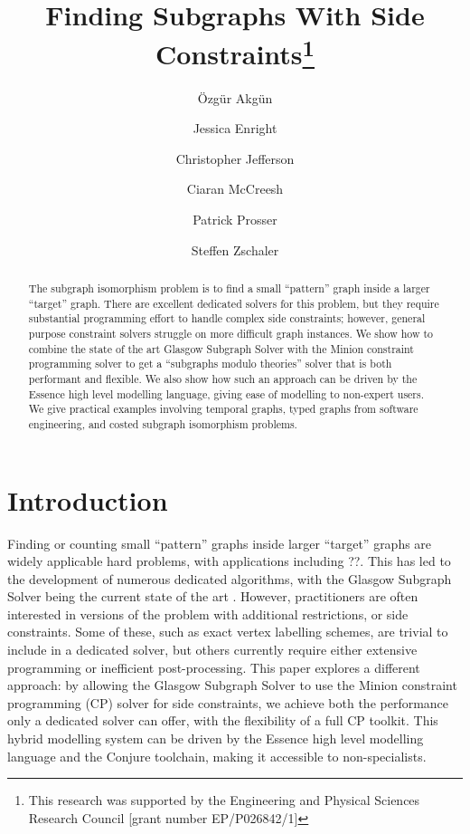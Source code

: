\documentclass[runningheads]{llncs}
\title{Finding Subgraphs With Side Constraints\thanks{This research was supported by the
Engineering and Physical Sciences Research Council [grant number EP/P026842/1]}}
\author{
    \"Ozg\"ur Akg\"un\inst{1} \and Jessica Enright\inst{2} \and Christopher
    Jefferson\inst{1} \and Ciaran McCreesh\inst{2} \and Patrick
    Prosser\inst{3} \and Steffen Zschaler\inst{4} \\
}
\institute{
    University of St Andrews, Scotland \and
    University of Glasgow, Scotland \\ \email{ciaran.mccreesh@glasgow.ac.uk} \and
    Algorithmicists Anonymous, Scotland \and
    King's College London, England
}
\begin{document}
\maketitle

\begin{abstract}
    The subgraph isomorphism problem is to find a small ``pattern'' graph inside a larger ``target''
    graph. There are excellent dedicated solvers for this problem, but they require substantial
    programming effort to handle complex side constraints; however, general purpose constraint
    solvers struggle on more difficult graph instances. We show how to combine the state of the art
    Glasgow Subgraph Solver with the Minion constraint programming solver to get a ``subgraphs modulo
    theories'' solver that is both performant and flexible. We also show how such an approach can be
    driven by the Essence high level modelling language, giving ease of modelling to non-expert
    users. We give practical examples involving
    temporal graphs, typed graphs from software engineering, and costed subgraph isomorphism
    problems.
\end{abstract}

\section{Introduction}

Finding or counting small ``pattern'' graphs inside larger ``target'' graphs are widely applicable
hard problems, with applications including ??. This has led to the development of numerous dedicated
algorithms, with the Glasgow Subgraph Solver \cite{DBLP:conf/gg/McCreeshP020} being the current
state of the art \cite{DBLP:conf/gbrpr/Solnon19}. However, practitioners are often interested in
versions of the problem with additional restrictions, or side constraints. Some of these, such as
exact vertex labelling schemes, are trivial to include in a dedicated solver, but others currently
require either extensive programming or inefficient post-processing. This paper explores a different
approach: by allowing the Glasgow Subgraph Solver to use the Minion constraint programming (CP) solver
\cite{DBLP:conf/ecai/GentJM06} for side constraints, we achieve both the performance only a
dedicated solver can offer, with the flexibility of a full CP toolkit. This
hybrid modelling system can be driven by the Essence high level modelling language
\cite{DBLP:journals/constraints/FrischHJHM08} and the Conjure toolchain, making it accessible to
non-specialists.
\end{document}
